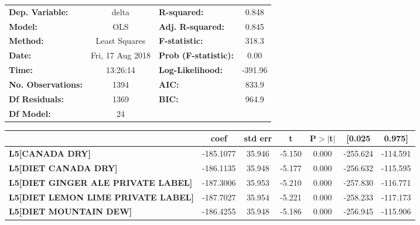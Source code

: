\begin{center}
\begin{tabular}{lclc}
\toprule
\textbf{Dep. Variable:}                    &      delta       & \textbf{  R-squared:         } &     0.848   \\
\textbf{Model:}                            &       OLS        & \textbf{  Adj. R-squared:    } &     0.845   \\
\textbf{Method:}                           &  Least Squares   & \textbf{  F-statistic:       } &     318.3   \\
\textbf{Date:}                             & Fri, 17 Aug 2018 & \textbf{  Prob (F-statistic):} &     0.00    \\
\textbf{Time:}                             &     13:26:14     & \textbf{  Log-Likelihood:    } &   -391.96   \\
\textbf{No. Observations:}                 &        1394      & \textbf{  AIC:               } &     833.9   \\
\textbf{Df Residuals:}                     &        1369      & \textbf{  BIC:               } &     964.9   \\
\textbf{Df Model:}                         &          24      & \textbf{                     } &             \\
\bottomrule
\end{tabular}
\begin{tabular}{lcccccc}
                                           & \textbf{coef} & \textbf{std err} & \textbf{t} & \textbf{P$>$$|$t$|$} & \textbf{[0.025} & \textbf{0.975]}  \\
\midrule
\textbf{L5[CANADA DRY]}                    &    -185.1077  &       35.946     &    -5.150  &         0.000        &     -255.624    &     -114.591     \\
\textbf{L5[DIET CANADA DRY]}               &    -186.1135  &       35.948     &    -5.177  &         0.000        &     -256.632    &     -115.595     \\
\textbf{L5[DIET GINGER ALE PRIVATE LABEL]} &    -187.3006  &       35.953     &    -5.210  &         0.000        &     -257.830    &     -116.771     \\
\textbf{L5[DIET LEMON LIME PRIVATE LABEL]} &    -187.7027  &       35.954     &    -5.221  &         0.000        &     -258.233    &     -117.173     \\
\textbf{L5[DIET MOUNTAIN DEW]}             &    -186.4255  &       35.948     &    -5.186  &         0.000        &     -256.945    &     -115.906     \\

\end{tabular}
\end{center}
